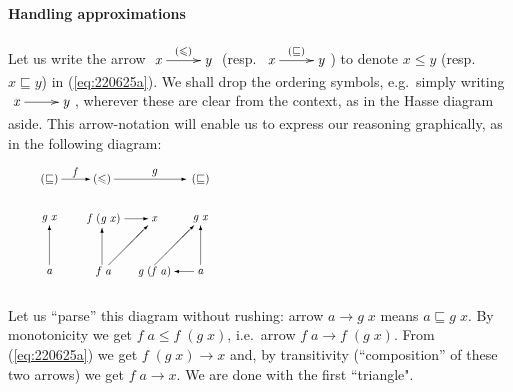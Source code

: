 \documentclass{elsarticle}
\newcommand{\Varid}[1]{\mathit{#1}}
\renewcommand{\leq}{\leqslant}
\def\rarrow#1#2#3{\xymatrix{ #1 \ar[r]^-{#2} & #3 }}
\begin{document}
\paragraph{Handling approximations}
Let us write the arrow \ensuremath{\rarrow{\Varid{x}}{(\leq )}{\Varid{y}}} (resp.\ \ensuremath{\rarrow{\Varid{x}}{(\sqsubseteq )}{\Varid{y}}})
to denote \ensuremath{\Varid{x}\leq \Varid{y}} (resp.\ \ensuremath{\Varid{x}\sqsubseteq \Varid{y}}) in (\ref{eq:220625a}). We shall drop
the ordering symbols, e.g.\ simply writing \ensuremath{\rarrow{\Varid{x}}{}{\Varid{y}}}, wherever these are clear from the context, as
in the Hasse diagram aside. This arrow-notation will enable us to express
our reasoning {graphically}, as in the following diagram:
\begin{eqnarray}
\vcenter{\mbox{
\begin{picture}(200,112)(0,0)
\unitlength=0.4mm
\let\framebox=\makebox
%
\put(10,80){\framebox(10,10){\ensuremath{(\sqsubseteq )}}}
\put(10,10){\framebox(10,10){\ensuremath{\Varid{a}}}}
\put(10,50){\framebox(10,10){\ensuremath{\Varid{g}\;\Varid{x}}}}
\put(15,20){\vector(0,1){30}}
%
\put(24,85){\vector(1,0){22}}
\put(30,85){\framebox(10,10){\ensuremath{\Varid{f}}}}
\put(50,80){\framebox(10,10){\ensuremath{(\leq )}}}
\put(50,10){\framebox(10,10){ \ensuremath{\Varid{f}\;\Varid{a}}}}
\put(55,20){\vector(0,1){28}}
\put(40,50){\framebox(30,10){ \ensuremath{\Varid{f}\;(\Varid{g}\;\Varid{x})}}}
%
\put(90,50){\framebox(10,10){\ensuremath{\Varid{x}}}}
\put(72,55){\vector(1,0){18}}
\put(60,20){\vector(1,1){30}}
%
\put(64,85){\vector(1,0){55}}
\put(90,85){\framebox(10,10){\ensuremath{\Varid{g}}}}
%
\put(125,80){\framebox(10,10){\ensuremath{(\sqsubseteq )}}}
\put(80,10){\framebox(30,10){\ensuremath{\Varid{g}\;(\Varid{f}\;\Varid{a})}}}
\put(95,20){\vector(1,1){30}}
\put(125,50){\framebox(10,10){\ensuremath{\Varid{g}\;\Varid{x}}}}

\put(125,10){\framebox(10,10){\ensuremath{\Varid{a}}}}
\put(125,15){\vector(-1,0){15}}

\put(130,20){\vector(0,1){30}}
\end{picture}
}} \rule{ 9em}{0pt} %
	\label{eq:221027b}
\end{eqnarray}

Let us ``parse'' this diagram without rushing: arrow \ensuremath{\Varid{a}\to \Varid{g}\;\Varid{x}} means \ensuremath{\Varid{a}\sqsubseteq \Varid{g}\;\Varid{x}}.
By monotonicity we get \ensuremath{\Varid{f}\;\Varid{a}\leq \Varid{f}\;(\Varid{g}\;\Varid{x})}, i.e.\  arrow \ensuremath{\Varid{f}\;\Varid{a}\to \Varid{f}\;(\Varid{g}\;\Varid{x})}. From (\ref{eq:220625a}) we
get \ensuremath{\Varid{f}\;(\Varid{g}\;\Varid{x})\to \Varid{x}} and, by transitivity (``composition'' of these two
arrows) we get \ensuremath{\Varid{f}\;\Varid{a}\to \Varid{x}}. We are done with the first ``triangle".
\end{document}
